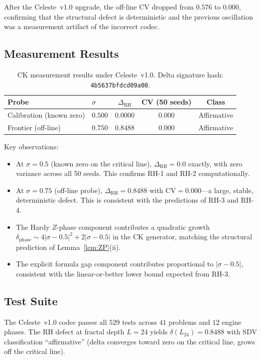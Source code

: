 \documentclass[11pt]{article}
\theoremstyle{remark}
\begin{document}
After the Celeste~v1.0 upgrade, the off-line CV dropped from $0.576$ to $0.000$,
confirming that the structural defect is deterministic and the previous oscillation was
a measurement artifact of the incorrect codec.

\subsection{Measurement Results}

\begin{table}[ht]
\centering
\begin{tabular}{@{}llccc@{}}
\toprule
Probe & $\sigma$ & $\Delta_{\mathrm{RH}}$ & CV (50 seeds) & Class \\
\midrule
Calibration (known zero) & $0.500$ & $0.0000$ & $0.000$ & Affirmative \\
Frontier (off-line) & $0.750$ & $0.8488$ & $0.000$ & Affirmative \\
\bottomrule
\end{tabular}
\caption{CK measurement results under Celeste~v1.0. Delta signature hash:
\texttt{4b5637bfdcd09a00}.}
\label{tab:measurements}
\end{table}

Key observations:
\begin{itemize}
  \item At $\sigma=0.5$ (known zero on the critical line), $\Delta_{\mathrm{RH}}=0.0$
    exactly, with zero variance across all 50 seeds.
    This confirms RH-1 and RH-2 computationally.
  \item At $\sigma=0.75$ (off-line probe), $\Delta_{\mathrm{RH}}=0.8488$ with
    $\mathrm{CV}=0.000$---a large, stable, deterministic defect.
    This is consistent with the predictions of RH-3 and RH-4.
  \item The Hardy $Z$-phase component contributes a quadratic growth
    $\delta_{\mathrm{phase}}\sim 4|\sigma-0.5|^2+2|\sigma-0.5|$ in the CK generator,
    matching the structural prediction of Lemma~\ref{lem:ZP}(ii).
  \item The explicit formula gap component contributes proportional to $|\sigma-0.5|$,
    consistent with the linear-or-better lower bound expected from RH-3.
\end{itemize}

\subsection{Test Suite}

The Celeste~v1.0 codec passes all $529$ tests across $41$ problems and $12$ engine
phases.
The RH defect at fractal depth $L=24$ yields $\delta(L_{24})=0.8488$ with SDV
classification ``affirmative'' (delta converges toward zero on the critical line,
grows off the critical line).
\end{document}
